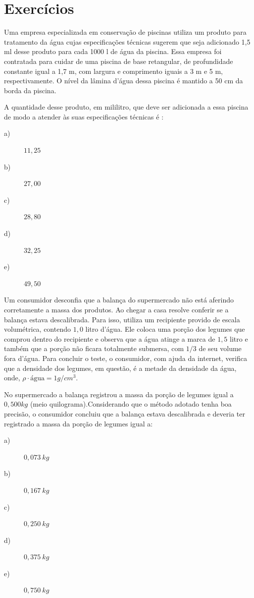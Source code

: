 \section{Exercícios}

	\begin{exercise}[ENEM 2017]
	Uma empresa especializada em conservação de piscinas utiliza um produto para tratamento da água cujas especificações técnicas sugerem que seja adicionado 1,5 ml desse produto para cada 1000 l de água da piscina. Essa empresa foi contratada para cuidar de uma piscina de base retangular, de profundidade constante igual a 1,7 m, com largura e comprimento iguais a 3 m e 5 m, respectivamente. O nível da lâmina d’água dessa piscina é mantido a 50 cm da borda da piscina.

A quantidade desse produto, em mililitro, que deve ser adicionada a essa piscina de modo a atender às suas especificações técnicas é :
    \begin{description}
        \item[a)] $11,25$
        \item[b)] $27,00$
        \item[c)] $28,80$
        \item[d)] $32,25$
        \item[e)] $49,50$
    \end{description}
\end{exercise}

\begin{exercise}[ENEM 2010]
Um consumidor desconfia que a balança do supermercado não está aferindo corretamente a massa dos produtos. Ao chegar a casa resolve conferir se a balança estava descalibrada. Para isso, utiliza um recipiente provido de escala volumétrica, contendo $1,0$ litro d’água. Ele coloca uma porção dos legumes que comprou dentro do recipiente e observa que a água atinge a marca de $1,5$ litro e também que a porção não ficara totalmente submersa, com $1/3$ de seu volume fora d’água. Para concluir o teste, o consumidor, com ajuda da internet, verifica que a  densidade dos legumes, em questão, é a metade da densidade da água, onde, $ \rho \cdot \textrm{água} = 1 g/cm^{3}$.

No supermercado a balança registrou a massa da porção de legumes igual a $0,500 kg$ (meio quilograma).Considerando que o método adotado tenha boa precisão, o consumidor concluiu que a balança estava descalibrada e deveria ter registrado a massa da porção de legumes igual a:

    \begin{description}
        \item[a)] $0,073~kg$
        \item[b)] $0,167~kg$
        \item[c)] $0,250~kg$
        \item[d)] $0,375~kg$
        \item[e)] $0,750~kg$
    \end{description}
\end{exercise}
	
